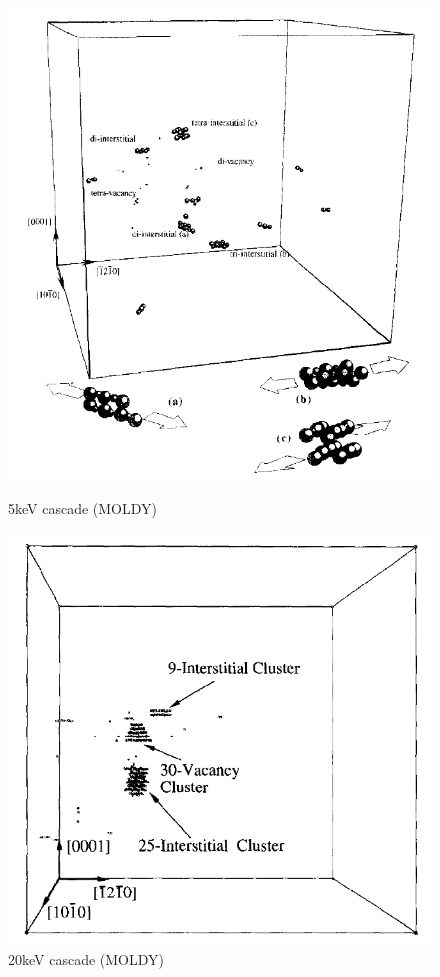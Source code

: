 \FloatBarrier
\begin{figure}[!htb]
\includegraphics[width=\linewidth]{chapters/interatomic_potential_fitting/images/moldy1.png}
\caption{5keV cascade (MOLDY)\cite{pkamoldy}}
\label{fig:moldy5kev}
\endminipage\hfill
{}
\includegraphics[width=\linewidth]{chapters/interatomic_potential_fitting/images/moldy2.png}
\caption{20keV cascade (MOLDY)\cite{pkamoldy}}
\label{fig:moldy20kev}
\endminipage
\end{figure}
\FloatBarrier

